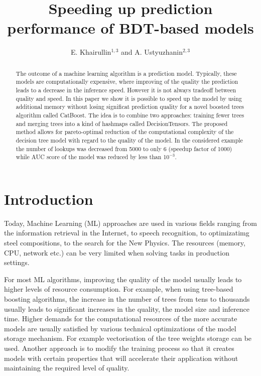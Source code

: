 \documentclass[a4paper]{jpconf}
\begin{document}
\title{Speeding up prediction performance of BDT-based models}

\author{
 E. Khairullin$^{1, 3}$
 and
 A. Ustyuzhanin$^{2, 3}$
}
\address{$^{1}$ Moscow Institute of Physics and Technology, Institutskiy per. 9, Dolgoprudny, Moscow Region, 141700, Russia}
\address{$^{2}$ National Research University Higher School of Economics, 20 Myasnitskaya st., Moscow 101000, Russia}
\address{$^{3}$ Yandex School of Data Analysis, 11/2, Timura Frunze st., Moscow 119021, Russia}


\begin{abstract}
The outcome of a machine learning algorithm is a prediction model. Typically, these models are computationally expensive, where improving of the quality the prediction leads to a decrease in the inference speed. However it is not always tradeoff between quality and speed. In this paper we show it is possible to speed up the model by using additional memory without losing significat prediction quality for a novel boosted trees algorithm called CatBoost. The idea is to combine two approaches: training fewer trees and merging trees into a kind of hashmaps called DecisionTensors. The proposed method allows for pareto-optimal reduction of the computational complexity of the decision tree model with regard to the quality of the model. In the considered example the number of lookups was decreased from 5000 to only 6 (speedup factor of 1000) while AUC score of the model was reduced by less than 1$0^{-3}$.
\end{abstract}

\section{Introduction}
Today, Machine Learning (ML) approaches are used in various fields ranging from the information retrieval in the Internet, to speech recognition, to optimizatimg steel compositions, to the search for the New Physics.
The resources (memory, CPU, network etc.) can be very limited when solving tasks in production settings.

For most ML algorithms, improving the quality of the model usually leads to higher levels of resource consumption. For example, when using tree-based boosting algorithms, the increase in the number of trees from tens to thousands usually leads to significant increases in the quality, the model size and inference time. Higher demands for the computational resources of the more accurate models are usually satisfied by various technical optimizations of the model storage mechanism. For example vectorisation of the tree weights storage can be used. Another approach is to modify the training process so that it creates models with certain properties that will accelerate their application without maintaining the required level of quality.
\end{document}

